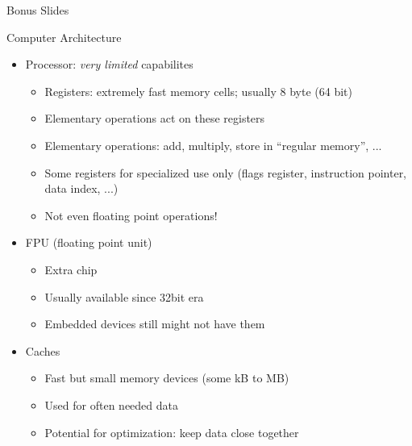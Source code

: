 
\begin{frame}
%
\begin{center}
\Huge
Bonus Slides
\end{center}
%
\end{frame}


\begin{frame}{Computer Architecture}
%
\begin{itemize}
\item Processor: \emph{very limited} capabilites
	\begin{itemize}
	\item Registers: extremely fast memory cells; usually 8 byte (64 bit)
	\item Elementary operations act on these registers
	\item Elementary operations: add, multiply, store in \enquote{regular memory}, ...
	\item Some registers for specialized use only (flags register, instruction pointer, data index, ...)
	\item Not even floating point operations!
	\end{itemize}
\item FPU (floating point unit)
	\begin{itemize}
	\item Extra chip
	\item Usually available since 32bit era
	\item Embedded devices still might not have them
	\end{itemize}
\item Caches
	\begin{itemize}
	\item Fast but small memory devices (some kB to MB)
	\item Used for often needed data
	\item[\Thus] Potential for optimization: keep data close together
	\end{itemize}
\end{itemize}
%
\end{frame}


